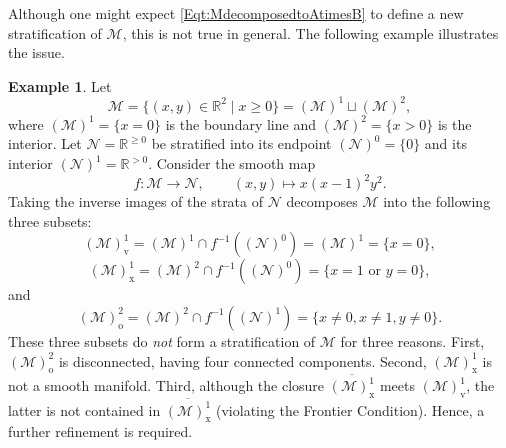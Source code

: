 \documentclass[12pt]{amsart}
\theoremstyle{definition}
\newtheorem{example}[theorem]{Example}
\numberwithin{equation}{section}
\newcommand{\SET}[1]{\{#1\}}
\begin{document}
{ 
Although one might expect \eqref{Eqt:MdecomposedtoAtimesB} to define a new stratification of $\mathcal{M}$, this is not true in general. The following example illustrates the issue.

\begin{example}
   \label{Example:Mdecomposesticky}
   Let
   \[
   \mathcal{M}=\SET{(x,y)\in \mathbb{R}^2\mid x\geqslant 0}
   =(\mathcal{M})^1\sqcup (\mathcal{M})^2,
   \]
   where $(\mathcal{M})^1=\SET{x=0}$ is the boundary line and $(\mathcal{M})^2=\SET{  x>0}$ is the interior. Let $\mathcal{N}=\mathbb{R}^{\geqslant 0}$ be stratified into its endpoint $(\mathcal{N})^0=\{0\}$ and its interior $(\mathcal{N})^1=\mathbb{R}^{>0}$. Consider the smooth map
   \[
   f:\mathcal{M}\to\mathcal{N},\qquad (x,y)\mapsto x(x-1)^2y^2.
   \]
   Taking the inverse images of the strata of $\mathcal{N}$ decomposes $\mathcal{M}$ into the following three subsets:
   \[
   (\mathcal{M})^1_{\mathrm{v}}
   =(\mathcal{M})^1\cap f^{-1}((\mathcal{N})^0)
   =(\mathcal{M})^1=\SET{x=0},
   \]
   \[
   (\mathcal{M})^1_{\mathrm{x}}
   =(\mathcal{M})^2\cap f^{-1}((\mathcal{N})^0)
   =\SET{  x=1 \mbox{ or } y=0},
   \]
   and
   \[
   (\mathcal{M})^2_{\mathrm{o}}
   =(\mathcal{M})^2\cap f^{-1}((\mathcal{N})^1)
   =\SET{x\neq 0,x\neq 1,y\neq 0}.
   \]
   These three subsets do \emph{not} form a stratification of $\mathcal{M}$ for three reasons. First, $(\mathcal{M})^2_{\mathrm{o}}$ is disconnected, having four connected components. Second, $(\mathcal{M})^1_{\mathrm{x}}$ is not a smooth manifold. Third, although the closure $\overline{(\mathcal{M})^1_{\mathrm{x}}}$ meets $(\mathcal{M})^1_{\mathrm{v}}$, the latter is not contained in $\overline{(\mathcal{M})^1_{\mathrm{x}}}$ (violating the Frontier Condition). Hence, a further refinement is required.


 \begin{figure}[htbp]   \centering  %
\end{figure}
\end{example}}
\end{document}
